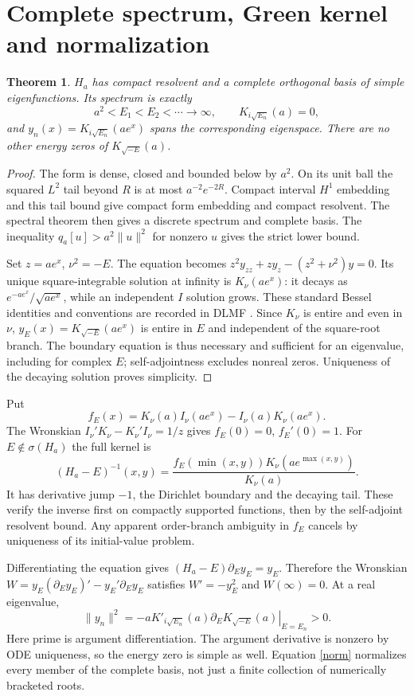 \documentclass[10pt]{article}
\newtheorem{theorem}{Theorem}
\begin{document}
\section{Complete spectrum, Green kernel and normalization}
\begin{theorem}
$H_a$ has compact resolvent and a complete orthogonal basis of simple
eigenfunctions. Its spectrum is exactly
\[
 a^2<E_1<E_2<\cdots\longrightarrow\infty,\qquad
 K_{i\sqrt{E_n}}(a)=0,
\]
and $y_n(x)=K_{i\sqrt{E_n}}(ae^x)$ spans the corresponding eigenspace.
There are no other energy zeros of $K_{\sqrt{-E}}(a)$.
\end{theorem}
\begin{proof}
The form is dense, closed and bounded below by $a^2$.
On its unit ball the squared $L^2$ tail beyond $R$ is at most
$a^{-2}e^{-2R}$. Compact interval $H^1$ embedding and this tail bound
give compact form embedding and compact resolvent. The spectral theorem
then gives a discrete spectrum and complete basis. The inequality
$q_a[u]>a^2\|u\|^2$ for nonzero $u$ gives the strict lower bound.

Set $z=ae^x$, $\nu^2=-E$. The equation becomes
$z^2y_{zz}+zy_z-(z^2+\nu^2)y=0$.
Its unique square-integrable solution at infinity is $K_\nu(ae^x)$:
it decays as $e^{-ae^x}/\sqrt{ae^x}$, while an independent $I$ solution
grows. These standard Bessel identities and conventions are recorded in
DLMF \cite{dlmf}. Since $K_\nu$ is entire and even in $\nu$,
$y_E(x)=K_{\sqrt{-E}}(ae^x)$ is entire in $E$ and independent of the
square-root branch. The boundary equation is thus necessary and sufficient
for an eigenvalue, including for complex $E$; self-adjointness excludes
nonreal zeros. Uniqueness of the decaying solution proves simplicity.
\end{proof}

Put
\[
 f_E(x)=K_\nu(a)I_\nu(ae^x)-I_\nu(a)K_\nu(ae^x).
\]
The Wronskian $I_\nu'K_\nu-K_\nu'I_\nu=1/z$ gives
$f_E(0)=0$, $f_E'(0)=1$. For $E\notin\sigma(H_a)$ the full kernel is
\begin{equation}\label{green}
 (H_a-E)^{-1}(x,y)=
 \frac{f_E(\min(x,y))K_\nu(ae^{\max(x,y)})}{K_\nu(a)}.
\end{equation}
It has derivative jump $-1$, the Dirichlet boundary and the decaying tail.
These verify the inverse first on compactly supported functions, then by
the self-adjoint resolvent bound. Any apparent order-branch ambiguity in
$f_E$ cancels by uniqueness of its initial-value problem.

Differentiating the equation gives
$(H_a-E)\partial_Ey_E=y_E$. Therefore the Wronskian
$W=y_E(\partial_Ey_E)'-y_E'\partial_Ey_E$ satisfies $W'=-y_E^2$
and $W(\infty)=0$. At a real eigenvalue,
\begin{equation}\label{norm}
 \|y_n\|^2=-aK'_{i\sqrt{E_n}}(a)
       \left.\partial_E K_{\sqrt{-E}}(a)\right|_{E=E_n}>0.
\end{equation}
Here prime is argument differentiation. The argument derivative is nonzero
by ODE uniqueness, so the energy zero is simple as well. Equation
\eqref{norm} normalizes every member of the complete basis, not just a
finite collection of numerically bracketed roots.
\end{document}

